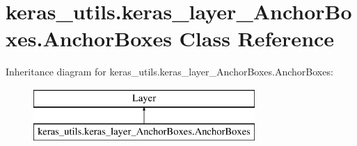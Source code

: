\hypertarget{classkeras__utils_1_1keras__layer___anchor_boxes_1_1_anchor_boxes}{}\section{keras\+\_\+utils.\+keras\+\_\+layer\+\_\+\+Anchor\+Boxes.\+Anchor\+Boxes Class Reference}
\label{classkeras__utils_1_1keras__layer___anchor_boxes_1_1_anchor_boxes}
Inheritance diagram for keras\+\_\+utils.\+keras\+\_\+layer\+\_\+\+Anchor\+Boxes.\+Anchor\+Boxes\+:\begin{figure}[H]
\begin{center}
\leavevmode
\includegraphics[height=2.000000cm]{classkeras__utils_1_1keras__layer___anchor_boxes_1_1_anchor_boxes}
\end{center}
\end{figure}
